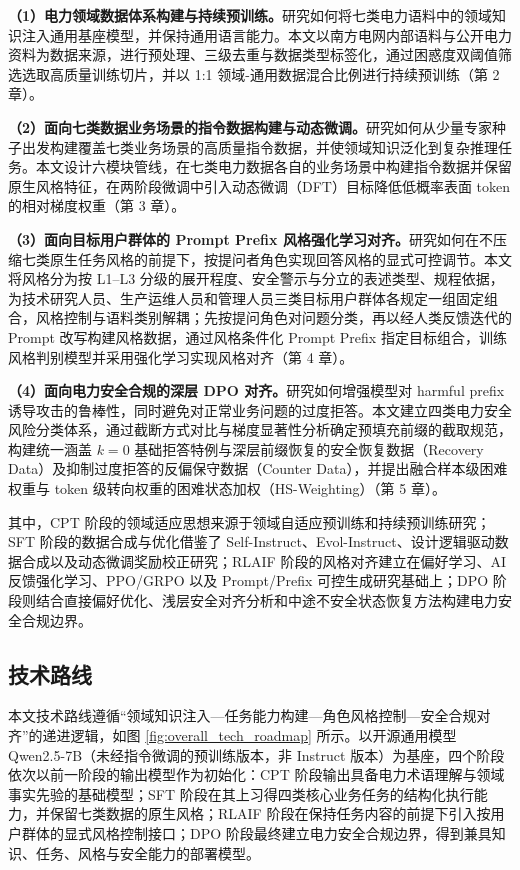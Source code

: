 \documentclass[fontset=fandol,type=master,campus=shenzhen,etitleauto=true]{hithesisbook}
\begin{document}
\textbf{（1）电力领域数据体系构建与持续预训练。}研究如何将七类电力语料中的领域知识注入通用基座模型，并保持通用语言能力。本文以南方电网内部语料与公开电力资料为数据来源，进行预处理、三级去重与数据类型标签化，通过困惑度双阈值筛选选取高质量训练切片，并以 1:1 领域-通用数据混合比例进行持续预训练（第 2 章）。

\textbf{（2）面向七类数据业务场景的指令数据构建与动态微调。}研究如何从少量专家种子出发构建覆盖七类业务场景的高质量指令数据，并使领域知识泛化到复杂推理任务。本文设计六模块管线，在七类电力数据各自的业务场景中构建指令数据并保留原生风格特征，在两阶段微调中引入动态微调（DFT）目标降低低概率表面 token 的相对梯度权重（第 3 章）。

\textbf{（3）面向目标用户群体的 Prompt Prefix 风格强化学习对齐。}研究如何在不压缩七类原生任务风格的前提下，按提问者角色实现回答风格的显式可控调节。本文将风格分为按 L1--L3 分级的展开程度、安全警示与分立的表述类型、规程依据，为技术研究人员、生产运维人员和管理人员三类目标用户群体各规定一组固定组合，风格控制与语料类别解耦；先按提问角色对问题分类，再以经人类反馈迭代的 Prompt 改写构建风格数据，通过风格条件化 Prompt Prefix 指定目标组合，训练风格判别模型并采用强化学习实现风格对齐（第 4 章）。

\textbf{（4）面向电力安全合规的深层 DPO 对齐。}研究如何增强模型对 harmful prefix 诱导攻击的鲁棒性，同时避免对正常业务问题的过度拒答。本文建立四类电力安全风险分类体系，通过截断方式对比与梯度显著性分析确定预填充前缀的截取规范，构建统一涵盖 $k=0$ 基础拒答特例与深层前缀恢复的安全恢复数据（Recovery Data）及抑制过度拒答的反偏保守数据（Counter Data），并提出融合样本级困难权重与 token 级转向权重的困难状态加权（HS-Weighting）（第 5 章）。

其中，CPT 阶段的领域适应思想来源于领域自适应预训练和持续预训练研究\cite{ref6,ref52}；SFT 阶段的数据合成与优化借鉴了 Self-Instruct、Evol-Instruct、设计逻辑驱动数据合成以及动态微调奖励校正研究\cite{ref24,ref25,ref53,ref54,ref82}；RLAIF 阶段的风格对齐建立在偏好学习、AI 反馈强化学习、PPO/GRPO 以及 Prompt/Prefix 可控生成研究基础上\cite{ref30,ref31,ref32,ref44,ref90,ref33,ref34,ref35,ref36,ref37,ref38,ref39}；DPO 阶段则结合直接偏好优化、浅层安全对齐分析和中途不安全状态恢复方法构建电力安全合规边界\cite{ref40,ref44,ref45,ref46,ref47,ref48,ref83,ref84}。

\subsection{技术路线}

本文技术路线遵循“领域知识注入—任务能力构建—角色风格控制—安全合规对齐”的递进逻辑，如图 \ref{fig:overall_tech_roadmap} 所示。以开源通用模型 Qwen2.5-7B\cite{ref55}（未经指令微调的预训练版本，非 Instruct 版本）为基座，四个阶段依次以前一阶段的输出模型作为初始化：CPT 阶段输出具备电力术语理解与领域事实先验的基础模型；SFT 阶段在其上习得四类核心业务任务的结构化执行能力，并保留七类数据的原生风格；RLAIF 阶段在保持任务内容的前提下引入按用户群体的显式风格控制接口；DPO 阶段最终建立电力安全合规边界，得到兼具知识、任务、风格与安全能力的部署模型。
\end{document}
